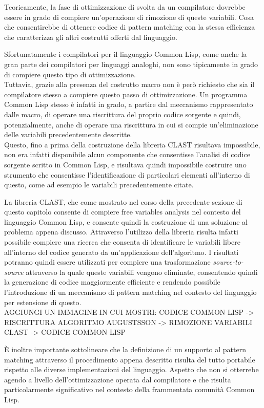 Teoricamente, la fase di ottimizzazione di svolta da un compilatore dovrebbe
essere in grado di compiere un'operazione di rimozione di queste variabili. Cosa
che consentirebbe di ottenere codice di pattern matching con la stessa
efficienza che caratterizza gli altri costrutti offerti dal linguaggio.

Sfortunatamente i compilatori per il linguaggio Common Lisp, come anche la gran
parte dei compilatori per linguaggi analoghi, non sono tipicamente in grado di
compiere questo tipo di ottimizzazione.\\

Tuttavia, grazie alla presenza del costrutto macro non è però richiesto che sia
il compilatore stesso a compiere questo passo di ottimizzazione. Un programma
Common Lisp stesso è infatti in grado, a partire dal meccanismo rappresentato
dalle macro, di operare una riscrittura del proprio codice sorgente e quindi,
potenzialmente, anche di operare una riscrittura in cui si compie
un'eliminazione delle variabili precedentemente descritte.\\

Questo, fino a prima della costruzione della libreria CLAST risultava
impossibile, non era infatti disponibile alcun componente che consentisse
l'analisi di codice sorgente scritto in Common Lisp, e risultava quindi
impossibile costruire uno strumento che consentisse l'identificazione di
particolari elementi all'interno di questo, come ad esempio le variabili
precedentemente citate.

La libreria CLAST, che come mostrato nel corso della precedente sezione di
questo capitolo consente di compiere free variables analysis nel contesto del
linguaggio Common Lisp, e consente quindi la costruzione di una soluzione al
problema appena discusso. Attraverso l'utilizzo della libreria risulta infatti
possibile compiere una ricerca che consenta di identificare le variabili libere
all'interno del codice generato da un'applicazione dell'algoritmo. I risultati
potranno quindi essere utilizzati per compiere una trasformazione \textit
{source-to-source} attraverso la quale queste variabili vengono eliminate,
consentendo quindi la generazione di codice maggiormente efficiente e rendendo
possibile l'introduzione di un meccanismo di pattern matching nel contesto del
linguaggio per estensione di questo.\\

AGGIUNGI UN IMMAGINE IN CUI MOSTRI: CODICE COMMON LISP -> RISCRITTURA ALGORITMO
AUGUSTSSON -> RIMOZIONE VARIABILI CLAST -> CODICE COMMON LISP

È inoltre importante sottolineare che la definizione di un supporto al pattern
matching attraverso il procedimento appena descritto risulta del tutto portabile
rispetto alle diverse implementazioni del linguaggio. Aspetto che non si
otterrebe agendo a livello dell'ottimizzazione operata dal compilatore e che
risulta particolarmente significativo nel contesto della frammentata comunità
Common Lisp.

